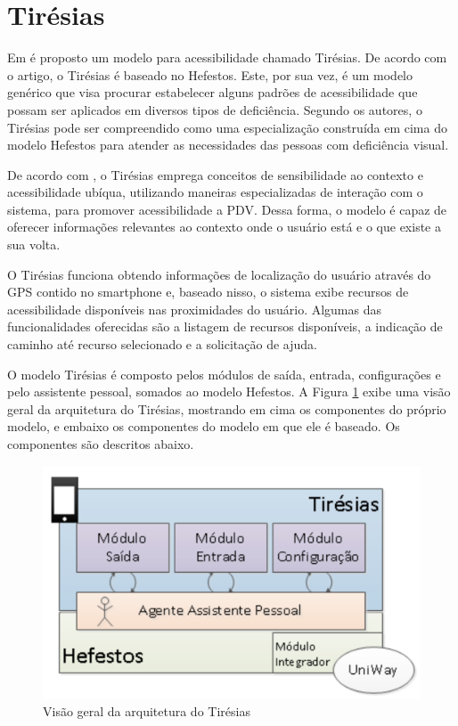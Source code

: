 \documentclass[english,brazilian]{UNISINOSmonografia}
\begin{document}
	\section{Tirésias}
Em  é proposto um modelo para acessibilidade chamado Tirésias. De acordo com o artigo, o Tirésias é baseado no Hefestos. Este, por sua vez, é um modelo genérico que visa procurar estabelecer alguns padrões de acessibilidade que possam ser aplicados em diversos tipos de deficiência. Segundo os autores, o Tirésias pode ser compreendido como uma especialização construída em cima do modelo Hefestos para atender as necessidades das pessoas com deficiência visual. 

De acordo com , o Tirésias emprega conceitos de sensibilidade ao contexto e acessibilidade ubíqua, utilizando maneiras especializadas de interação com o sistema, para promover acessibilidade a PDV. Dessa forma, o modelo é capaz de oferecer informações relevantes ao contexto onde o usuário está e o que existe a sua volta.

O Tirésias funciona obtendo informações de localização do usuário através do GPS contido no smartphone e, baseado nisso, o sistema exibe recursos de acessibilidade disponíveis nas proximidades do usuário. Algumas das funcionalidades oferecidas são a listagem de recursos disponíveis, a indicação de caminho até recurso selecionado e a solicitação de ajuda.

O modelo Tirésias é composto pelos módulos de saída, entrada, configurações e pelo assistente pessoal, somados ao modelo Hefestos. A Figura \ref{fig:visaoGeralTiresias} exibe uma visão geral da arquitetura do Tirésias, mostrando em cima os componentes do próprio modelo, e embaixo os componentes do modelo em que ele é baseado. Os componentes são descritos abaixo.

\begin{figure}[!ht]
	\caption{Visão geral da arquitetura do Tirésias}
	\label{fig:visaoGeralTiresias}
	\centering%
	\begin{minipage}{.6\textwidth}
		\includegraphics[width=\textwidth]{imgs/tiresiasArquitetura}
		\end{minipage}
\end{figure}
\end{document}
